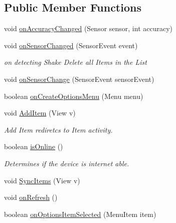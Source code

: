 \subsection*{Public Member Functions}
\begin{DoxyCompactItemize}
\item 
void \hyperlink{classcom_1_1example_1_1santh_1_1shoppinglist_1_1_list_activity_ad2d33376b6c33875d85c9250077c7f0a}{on\+Accuracy\+Changed} (Sensor sensor, int accuracy)
\item 
void \hyperlink{classcom_1_1example_1_1santh_1_1shoppinglist_1_1_list_activity_a3fe70255c4756fc99021e0ed27683548}{on\+Sensor\+Changed} (Sensor\+Event event)
\begin{DoxyCompactList}\small\item\em on detecting Shake Delete all Items in the List \end{DoxyCompactList}\item 
void \hyperlink{classcom_1_1example_1_1santh_1_1shoppinglist_1_1_list_activity_ab9ad7fc938dbd932094363fc1e56eac9}{on\+Sensor\+Change} (Sensor\+Event sensor\+Event)
\item 
boolean \hyperlink{classcom_1_1example_1_1santh_1_1shoppinglist_1_1_list_activity_a89a36a191d70c8b9d07db5eda2e804e4}{on\+Create\+Options\+Menu} (Menu menu)
\item 
void \hyperlink{classcom_1_1example_1_1santh_1_1shoppinglist_1_1_list_activity_a3aa761782d9eb5c28ec21734e407970d}{Add\+Item} (View v)
\begin{DoxyCompactList}\small\item\em Add Item rediretcs to Item activity. \end{DoxyCompactList}\item 
boolean \hyperlink{classcom_1_1example_1_1santh_1_1shoppinglist_1_1_list_activity_a1a93b6350edb03460299def603c57a44}{is\+Online} ()
\begin{DoxyCompactList}\small\item\em Determines if the device is internet able. \end{DoxyCompactList}\item 
void \hyperlink{classcom_1_1example_1_1santh_1_1shoppinglist_1_1_list_activity_a019462edc2e1d011fe110720b294fe41}{Sync\+Items} (View v)
\item 
void \hyperlink{classcom_1_1example_1_1santh_1_1shoppinglist_1_1_list_activity_aeb713dae9574328c1179a3a1fe298365}{on\+Refresh} ()
\item 
boolean \hyperlink{classcom_1_1example_1_1santh_1_1shoppinglist_1_1_list_activity_a07f94ec03899822148ce095082318cdb}{on\+Options\+Item\+Selected} (Menu\+Item item)

\end{DoxyCompactItemize}
